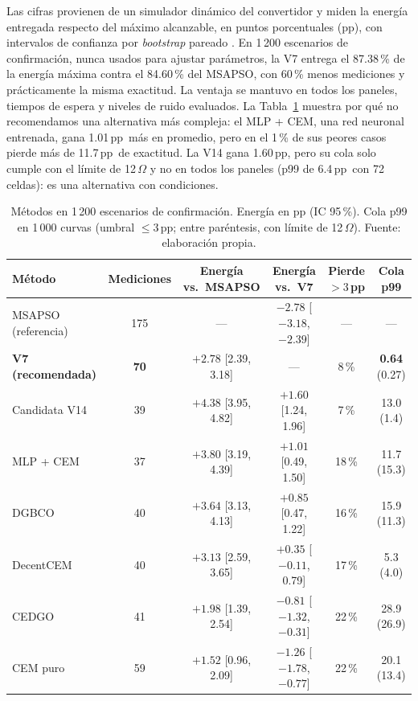 \documentclass[letterpaper,11pt]{article}
\newcommand{\pp}{\,pp}
\begin{document}
Las cifras provienen de un simulador dinámico del convertidor y miden la energía entregada respecto del máximo alcanzable, en puntos porcentuales (pp), con intervalos de confianza por \textit{bootstrap} pareado \parencite{efron1993}. En 1\,200 escenarios de confirmación, nunca usados para ajustar parámetros, la V7 entrega el 87.38\,\% de la energía máxima contra el 84.60\,\% del MSAPSO, con 60\,\% menos mediciones y prácticamente la misma exactitud. La ventaja se mantuvo en todos los paneles, tiempos de espera y niveles de ruido evaluados. La Tabla~\ref{tab:metodos} muestra por qué no recomendamos una alternativa más compleja: el MLP + CEM, una red neuronal entrenada, gana 1.01\pp\ más en promedio, pero en el 1\,\% de sus peores casos pierde más de 11.7\pp\ de exactitud. La V14 gana 1.60\pp, pero su cola solo cumple con el límite de 12\,$\Omega$ y no en todos los paneles (p99 de 6.4\pp\ con 72 celdas): es una alternativa con condiciones.

\begin{table}[h]
\centering\footnotesize{}\setlength{\tabcolsep}{4pt}
\caption{Métodos en 1\,200 escenarios de confirmación. Energía en pp (IC 95\,\%). Cola p99 en 1\,000 curvas (umbral $\le 3$\pp; entre paréntesis, con límite de 12\,$\Omega$). Fuente: elaboración propia.}
\label{tab:metodos}
\begin{tabular}{@{}lccccc@{}}
\toprule
Método & Mediciones & Energía vs.\ MSAPSO & Energía vs.\ V7 & Pierde $>3$\pp & Cola p99\\
\midrule
MSAPSO (referencia) & 175 & --- & $-2.78$ [$-3.18$, $-2.39$] & --- & --- \\
\textbf{V7 (recomendada)} & \textbf{70} & $\mathbf{+2.78}$ [2.39, 3.18] & --- & 8\,\% & \textbf{0.64} (0.27) \\
Candidata V14 & 39 & $+4.38$ [3.95, 4.82] & $+1.60$ [1.24, 1.96] & 7\,\% & 13.0 (1.4) \\
MLP + CEM & 37 & $+3.80$ [3.19, 4.39] & $+1.01$ [0.49, 1.50] & 18\,\% & 11.7 (15.3) \\
DGBCO & 40 & $+3.64$ [3.13, 4.13] & $+0.85$ [0.47, 1.22] & 16\,\% & 15.9 (11.3) \\
DecentCEM & 40 & $+3.13$ [2.59, 3.65] & $+0.35$ [$-0.11$, 0.79] & 17\,\% & 5.3 (4.0) \\
CEDGO & 41 & $+1.98$ [1.39, 2.54] & $-0.81$ [$-1.32$, $-0.31$] & 22\,\% & 28.9 (26.9) \\
CEM puro & 59 & $+1.52$ [0.96, 2.09] & $-1.26$ [$-1.78$, $-0.77$] & 22\,\% & 20.1 (13.4) \\
\bottomrule
\end{tabular}
\end{table}
\end{document}

